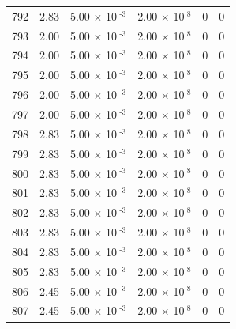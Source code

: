 \documentclass[a4paper,11pt]{article}
\begin{document}
\begin{center}
\begin{longtable}{|R{1.5cm}|R{2.4cm}|R{2.4cm}|R{2.4cm}|R{2.4cm}|R{2.4cm}|}
  792 &   2.83  &         5.00 $\times$ 10$^{\text{          -3}}$  &         2.00 $\times$ 10$^{\text{           8}}$  & 0  & 0 \\
  793 &   2.00  &         5.00 $\times$ 10$^{\text{          -3}}$  &         2.00 $\times$ 10$^{\text{           8}}$  & 0  & 0 \\
  794 &   2.00  &         5.00 $\times$ 10$^{\text{          -3}}$  &         2.00 $\times$ 10$^{\text{           8}}$  & 0  & 0 \\
  795 &   2.00  &         5.00 $\times$ 10$^{\text{          -3}}$  &         2.00 $\times$ 10$^{\text{           8}}$  & 0  & 0 \\
  796 &   2.00  &         5.00 $\times$ 10$^{\text{          -3}}$  &         2.00 $\times$ 10$^{\text{           8}}$  & 0  & 0 \\
  797 &   2.00  &         5.00 $\times$ 10$^{\text{          -3}}$  &         2.00 $\times$ 10$^{\text{           8}}$  & 0  & 0 \\
  798 &   2.83  &         5.00 $\times$ 10$^{\text{          -3}}$  &         2.00 $\times$ 10$^{\text{           8}}$  & 0  & 0 \\
  799 &   2.83  &         5.00 $\times$ 10$^{\text{          -3}}$  &         2.00 $\times$ 10$^{\text{           8}}$  & 0  & 0 \\
  800 &   2.83  &         5.00 $\times$ 10$^{\text{          -3}}$  &         2.00 $\times$ 10$^{\text{           8}}$  & 0  & 0 \\
  801 &   2.83  &         5.00 $\times$ 10$^{\text{          -3}}$  &         2.00 $\times$ 10$^{\text{           8}}$  & 0  & 0 \\
  802 &   2.83  &         5.00 $\times$ 10$^{\text{          -3}}$  &         2.00 $\times$ 10$^{\text{           8}}$  & 0  & 0 \\
  803 &   2.83  &         5.00 $\times$ 10$^{\text{          -3}}$  &         2.00 $\times$ 10$^{\text{           8}}$  & 0  & 0 \\
  804 &   2.83  &         5.00 $\times$ 10$^{\text{          -3}}$  &         2.00 $\times$ 10$^{\text{           8}}$  & 0  & 0 \\
  805 &   2.83  &         5.00 $\times$ 10$^{\text{          -3}}$  &         2.00 $\times$ 10$^{\text{           8}}$  & 0  & 0 \\
  806 &   2.45  &         5.00 $\times$ 10$^{\text{          -3}}$  &         2.00 $\times$ 10$^{\text{           8}}$  & 0  & 0 \\
  807 &   2.45  &         5.00 $\times$ 10$^{\text{          -3}}$  &         2.00 $\times$ 10$^{\text{           8}}$  & 0  & 0 \\

\end{longtable}
\end{center}
\end{document}

